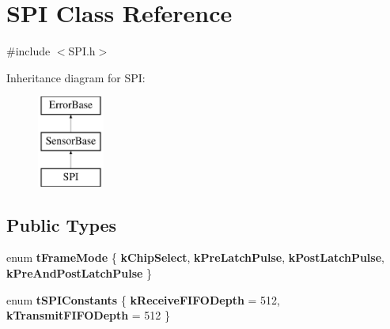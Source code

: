 \hypertarget{classSPI}{
\section{SPI Class Reference}
\label{classSPI}
}


{\ttfamily \#include $<$SPI.h$>$}

Inheritance diagram for SPI:\begin{figure}[H]
\begin{center}
\leavevmode
\includegraphics[height=3.000000cm]{classSPI}
\end{center}
\end{figure}
\subsection*{Public Types}
\begin{DoxyCompactItemize}
\item 
enum {\bfseries tFrameMode} \{ {\bfseries kChipSelect}, 
{\bfseries kPreLatchPulse}, 
{\bfseries kPostLatchPulse}, 
{\bfseries kPreAndPostLatchPulse}
 \}
\item 
enum {\bfseries tSPIConstants} \{ {\bfseries kReceiveFIFODepth} = 512, 
{\bfseries kTransmitFIFODepth} = 512
 \}
\end{DoxyCompactItemize}
